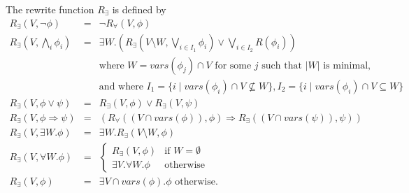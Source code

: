 \documentclass{article}
\newcommand{\vars}{\mathit{vars}}
\begin{document}
The rewrite function $R_{\exists}$ is defined by
\begin{equation*}
\begin{array}{lll}
R_{\exists}(V,\neg \phi)&=&\neg R_{\forall}(V,\phi)\\

R_{\exists}(V, \bigwedge_i \phi_i)&=&
  \exists W.
    \left(
         R_\exists(V \setminus W, \bigvee_{i \in I_1}\phi_i) \lor \bigvee_{i \in I_2}R(\phi_i)
    \right) \\
  && \text{where } W = \vars(\phi_j) \cap V \text{ for some $j$ such that $|W|$ is minimal,} \\
  && \text{and where } I_1 = \{ i \mid \vars(\phi_i) \cap V \nsubseteq W \}, I_2 = \{ i \mid \vars(\phi_i) \cap V \subseteq W \} \\

R_{\exists}(V,\phi\vee \psi)&=&R_{\exists}(V,\phi)\vee R_{\exists}(V,\psi)\\

R_{\exists}(V,\phi\Rightarrow\psi)&=&
(R_{\forall}((V\cap \vars(\phi)),\phi)\Rightarrow
R_{\exists}((V\cap\vars(\psi)),\psi))\\

R_{\exists}(V,\exists W.\phi)&=&\exists W.R_{\exists}(V\setminus W,\phi)\\

R_{\exists}(V,\forall W.\phi)&=&
\left\{\begin{array}{ll}
R_{\exists}(V,\phi)&\textrm{if }W=\emptyset\\
\exists V.\forall W.\phi&\textrm{otherwise}
\end{array}\right.\\

R_{\exists}(V,\phi)&=&\exists V\cap\vars(\phi).\phi\textrm{ otherwise}.
\end{array}
\end{equation*}
\end{document}
